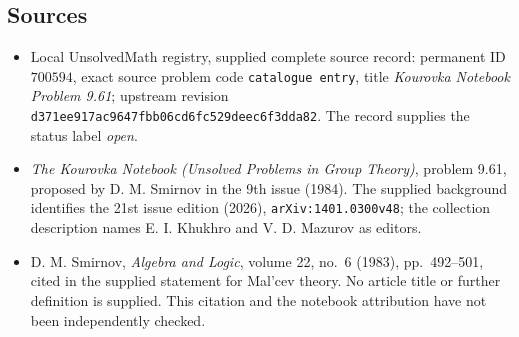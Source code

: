 \documentclass[11pt]{article}
\begin{document}
\subsection{Sources}
\begin{itemize}
\item Local UnsolvedMath registry, supplied complete source record: permanent ID \(700594\), exact source problem code \texttt{catalogue entry}, title \emph{Kourovka Notebook Problem 9.61}; upstream revision \texttt{d371ee917ac9647fbb06cd6fc529deec6f3dda82}. The record supplies the status label \emph{open}.
\item \emph{The Kourovka Notebook (Unsolved Problems in Group Theory)}, problem 9.61, proposed by D. M. Smirnov in the 9th issue (1984). The supplied background identifies the 21st issue edition (2026), \texttt{arXiv:1401.0300v48}; the collection description names E. I. Khukhro and V. D. Mazurov as editors.
\item D. M. Smirnov, \emph{Algebra and Logic}, volume 22, no.\ 6 (1983), pp.\ 492--501, cited in the supplied statement for Mal'cev theory. No article title or further definition is supplied. This citation and the notebook attribution have not been independently checked.
\end{itemize}
\end{document}
